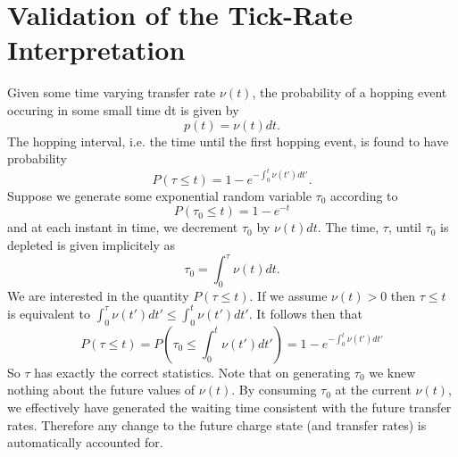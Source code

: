 \documentclass[11pt]{article}
\newcommand{\bibfile}{refs.bib}
\newcommand{\kt}{k_B T}
\begin{document}
\clearpage
\appendix

\section{Validation of the Tick-Rate Interpretation}
\label{app:tickrate}

Given some time varying transfer rate $\nu(t)$, the probability of a hopping event occuring in some small time dt is given by 
\begin{equation}
p(t) = \nu(t) dt.
\end{equation}
The hopping interval, i.e. the time until the first hopping event, is found to have probability
\begin{equation}
P(\tau \leq t) = 1-e^{-\int_0^t \nu(t')dt'}.
\end{equation}
Suppose we generate some exponential random variable $\tau_0$ according to
\begin{equation}
P(\tau_0 \leq t) = 1-e^{-t}
\end{equation}
and at each instant in time, we decrement $\tau_0$ by $\nu(t)dt$. The time, $\tau$, until $\tau_0$ is depleted is given implicitely as
\begin{equation}
\tau_0 = \int_0^\tau \nu(t) dt.
\end{equation}
We are interested in the quantity $P(\tau \leq t)$. If we assume $\nu(t)>0$ then $\tau \leq t$ is equivalent to $\int_0^\tau \nu(t') dt' \leq \int_0^t \nu(t')dt'$. It follows then that
\begin{equation}
P(\tau \leq t) = P\left( \tau_0 \leq \int_0^t \nu(t')dt' \right) = 1-e^{-\int_0^t \nu(t')dt'}
\end{equation}
So $\tau$ has exactly the correct statistics. Note that on generating $\tau_0$ we knew nothing about the future values of $\nu(t)$. By consuming $\tau_0$ at the current $\nu(t)$, we effectively have generated the waiting time consistent with the future transfer rates. Therefore any change to the future charge state (and transfer rates) is automatically accounted for.






\end{document}
